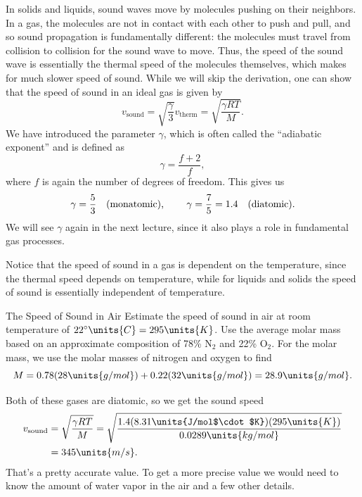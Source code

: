 In solids and liquids, sound waves move by molecules pushing on their
neighbors.  In a gas, the molecules are not in contact with each other
to push and pull, and so sound propagation is fundamentally different:
the molecules must travel from collision to collision for the sound
wave to move.  Thus, the speed of the sound wave is essentially the
thermal speed of the molecules themselves, which makes for much slower
speed of sound.  While we will skip the derivation, one can show that
the speed of sound in an ideal gas is given by
\begin{equation}
v_\text{sound} = \sqrt{\frac{\gamma}{3}} v_\text{therm} = 
\sqrt{\frac{\gamma RT}{M}}.
\end{equation}
We have introduced the parameter $\gamma$, which is often called
the ``adiabatic exponent'' and is defined as 
\begin{equation}
\gamma = \frac{f+2}{f},
\end{equation}
where $f$ is again the number of degrees of freedom.
This gives us
\begin{equation}
\gamma = \frac{5}{3} \text{\quad(monatomic), \qquad}
\gamma = \frac{7}{5}=1.4\text{\quad(diatomic).}
\end{equation}
We will see $\gamma$ again in the next lecture, since it also plays a
role in fundamental gas processes.

Notice that the speed of sound in a gas is dependent on the
temperature, since the thermal speed depends on temperature, while for
liquids and solids the speed of sound is essentially independent of 
temperature.

\begin{example}{The Speed of Sound in Air}
Estimate the speed of sound in air at room temperature of $22^\circ\units{C}
 = 295\units{K}$.  Use the average molar mass based
on an approximate composition of 78\% N$_2$ and 22\% O$_2$.
\solution
For the molar mass, we use the molar masses of nitrogen and oxygen
to find
\begin{equation}
M = 0.78 (28\units{g/mol}) + 0.22 (32\units{g/mol}) = 28.9\units{g/mol}.
\end{equation}

Both of these gases are diatomic, so we get the sound speed
\begin{align}
v_\text{sound} &= \sqrt{\frac{\gamma R T}{M}}  
=\sqrt{\frac{1.4(8.31\units{J/mol$\cdot$K})(295\units{K})}
{0.0289\units{kg/mol}}}\nonumber\\
&= 345\units{m/s}.
\end{align}
That's a pretty accurate value.  To get a more precise value we would need
to know the amount of water vapor in the air and a few other details.
\end{example}


